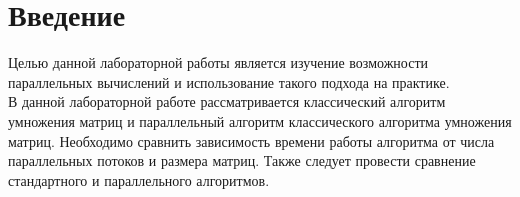 \documentclass[a4paper, 12pt]{article}
\begin{document}
\tableofcontents
\clearpage
\newpage

\section*{Введение}

\begin{flushleft}
	\hspace*{5mm} Целью данной лабораторной работы является изучение возможности параллельных вычислений и использование такого подхода на практике.\\ В данной лабораторной работе рассматривается классический алгоритм умножения матриц и параллельный алгоритм классического алгоритма умножения матриц. Необходимо сравнить зависимость времени работы алгоритма от числа параллельных потоков и размера матриц. Также следует провести сравнение стандартного и параллельного алгоритмов.
\end{flushleft}
\clearpage
\newpage
\end{document}
